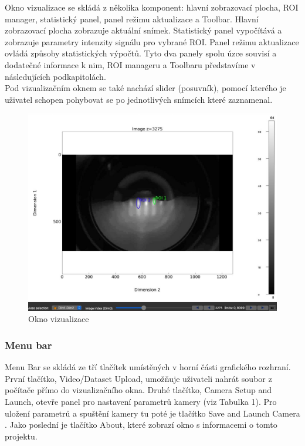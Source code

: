 \documentclass[a4paper,11pt]{article}
\begin{document}
Okno vizualizace se skládá z několika komponent: hlavní zobrazovací plocha, ROI manager, statistický panel, panel režimu aktualizace a Toolbar. Hlavní zobrazovací plocha zobrazuje aktuální snímek. Statistický panel vypočítává a zobrazuje parametry intenzity signálu pro vybrané ROI. Panel režimu aktualizace ovládá způsoby statistických výpočtů. Tyto dva panely spolu úzce souvisí a dodatečné informace k nim, ROI manageru a Toolbaru představíme v následujících podkapitolách.\\

Pod vizualizačním oknem se také nachází slider (posuvník), pomocí kterého je uživatel schopen pohybovat se po jednotlivých snímcích které zaznamenal.\\

\begin{figure}
    \centering
    \includegraphics[width=1\textwidth]{images/GUI.jpg}
    \caption{Okno vizualizace}
\end{figure}

\newpage
\subsubsection{Menu bar}
Menu Bar se skládá ze tří tlačítek umístěných v horní části grafického rozhraní. První tlačítko, Video/Dataset Upload, umožňuje uživateli nahrát soubor z počítače přímo do vizualizačního okna. Druhé tlačítko, Camera Setup and Launch, otevře panel pro nastavení parametrů kamery (viz Tabulka 1). Pro uložení parametrů a spuštění kamery tu poté je tlačítko Save and Launch Camera . Jako poslední je tlačítko About, které zobrazí okno s informacemi o tomto projektu.
\end{document}
